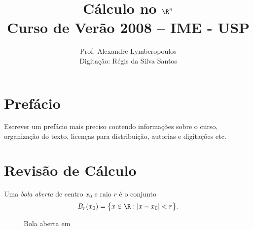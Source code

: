 \documentclass{book}
\title{Cálculo no $\R^n$ \\ Curso de Verão 2008 -- IME - USP}
\author{Prof. Alexandre Lymberopoulos\\ Digitação: Régis da Silva Santos}
\begin{document}

\frontmatter

\maketitle

\chapter*{Prefácio}

Escrever um prefácio mais preciso contendo informações sobre o curso,
organização do texto, licenças para distribuição, autorias e digitações
etc.







\tableofcontents
\listoffigures

\mainmatter

\chapter{Revisão de Cálculo}\label{revcalc}

\begin{defi}
  Uma \emph{bola aberta} de centro $x_0$ e raio $r$ é
  o conjunto \[B_r(x_0)=\big\{x\in\R:|x-x_0|<r\big\}.\]
  \begin{figure}[h]
    \centering
    
    \caption{Bola aberta em \R}
    \label{fig:bolaaberta}
  \end{figure}
\end{defi}
\end{document}
